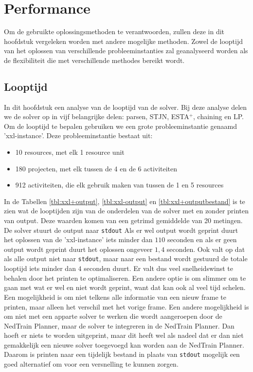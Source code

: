 \section{Performance}
Om de gebruikte oplossingsmethoden te verantwoorden, zullen deze in dit hoofdstuk vergeleken worden met andere mogelijke methoden. Zowel de looptijd van het oplossen van verschillende probleeminstanties zal geanalyseerd worden als de flexibiliteit die met verschillende methodes bereikt wordt.

\subsection{Looptijd}
In dit hoofdstuk een analyse van de looptijd van de solver. Bij deze analyse delen we de solver op in vijf belangrijke delen: parsen, STJN, ESTA$^+$, chaining en LP. Om de looptijd te bepalen gebruiken we een grote probleeminstantie genaamd 'xxl-instance'. Deze probleeminstantie bestaat uit:
\begin{itemize}
    \item 10 resources, met elk 1 resource unit
    \item 180 projecten, met elk tussen de 4 en de 6 activiteiten
    \item 912 activiteiten, die elk gebruik maken van tussen de 1 en 5 resources
\end{itemize}

In de Tabellen \ref{tbl:xxl+output}, \ref{tbl:xxl-output} en \ref{tbl:xxl+outputbestand} is te zien wat de looptijden zijn van de onderdelen van de solver met en zonder printen van output. Deze waarden komen van een getrimd gemiddelde van 20 metingen. De solver stuurt de output naar \texttt{stdout} Als er wel output wordt geprint duurt het oplossen van de 'xxl-instance' iets minder dan $110$ seconden en als er geen output wordt geprint duurt het oplossen ongeveer $1,4$ seconden. Ook valt op dat als alle output niet naar \texttt{stdout}, maar naar een bestand wordt gestuurd de totale looptijd iets minder dan $4$ seconden duurt. Er valt dus veel snelheidswinst te behalen door het printen te optimaliseren. Een andere optie is om slimmer om te gaan met wat er wel en niet wordt geprint, want dat kan ook al veel tijd schelen. Een mogelijkheid is om niet telkens alle informatie van een nieuw frame te printen, maar alleen het verschil met het vorige frame. Een andere mogelijkheid is om niet met een apparte solver te werken die wordt aangeroepen door de NedTrain Planner, maar de solver te integreren in de NedTrain Planner. Dan hoeft er niets te worden uitgeprint, maar dit heeft wel als nadeel dat er dan niet gemakkelijk een nieuwe solver toegevoegd kan worden aan de NedTrain Planner. Daarom is printen naar een tijdelijk bestand in plaats van \texttt{stdout} mogelijk een goed alternatief om voor een versnelling te kunnen zorgen. 

